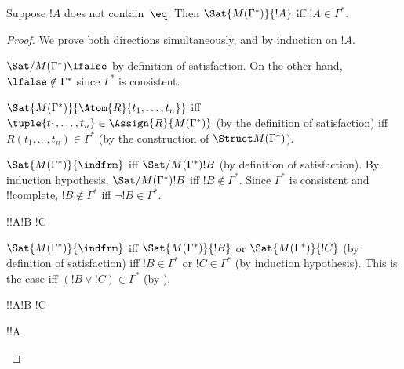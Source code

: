 \begin{lem}
 Suppose $!A$ does not contain~$\eq$. Then
$\Sat{M(\Gamma^*)}{!A}$ iff $!A \in \Gamma^*$.
\end{lem}

\begin{proof}
We prove both directions simultaneously, and by induction on $!A$.
\begin{enumerate}
  {$\Sat/{M(\Gamma^*)}{\lfalse}$
    by definition of satisfaction. On the other hand, $\lfalse \notin
    \Gamma^*$ since $\Gamma^*$ is consistent.}



  {$\Sat{M(\Gamma^*)}{\Atom{R}{t_1, \dots, t_n}}$ iff $\tuple{t_1,
      \dots, t_n} \in \Assign{R}{M(\Gamma^*)}$ (by the definition of
    satisfaction) iff $R(t_1, \dots, t_n) \in \Gamma^*$ (by the
    construction of $\Struct
    M(\Gamma^*)$).}


    {$\Sat{M(\Gamma^*)}{\indfrm}$ iff
    $\Sat/{M(\Gamma^*)}{!B}$ (by
    definition of satisfaction). By induction hypothesis,
    $\Sat/{M(\Gamma^*)}{!B}$ iff
    $!B \notin \Gamma^*$. Since $\Gamma^*$ is consistent and
    !!{complete}, $!B
    \notin \Gamma^*$ iff $\lnot !B \in \Gamma^*$.}



  \indcase!{!A}{!B \land !C}{}



    {$\Sat{M(\Gamma^*)}{\indfrm}$
    iff $\Sat{M(\Gamma^*)}{!B}$ or
    $\Sat{M(\Gamma^*)}{!C}$ (by
    definition of satisfaction) iff $!B \in \Gamma^*$ or $!C \in
    \Gamma^*$ (by induction hypothesis). This is the case iff $(!B
    \lor !C) \in \Gamma^*$ (by
    ).}
  


  \indcase!{!A}{!B \lif !C}{}



  
    \indcase!{!A}{\lforall[x][!B(x)]}{}


  

\end{enumerate}
\end{proof}




